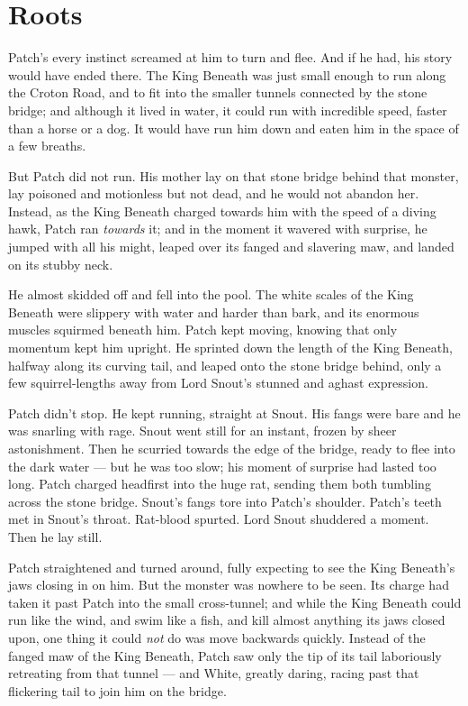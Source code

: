 \documentclass[ebook,oneside,openany,17pt]{memoir}
\newenvironment{tolerant}[1]{%
  \par\tolerance=#1\relax
}{%
  \par
}
\renewcommand{\thechapter}{\Roman{chapter}}
\newcounter{sections}
\newcommand{\sections}[1]{%
  \section*{#1}
  \addtocounter{sections}{1}%
  \pdfbookmark[1]{#1}{section.\thechapter.\thesections}}
\begin{document}

\sections{Roots}

Patch’s every instinct screamed at him to turn and flee. And if he
had, his story would have ended there. The King Beneath was just small
enough to run along the Croton Road, and to fit into the smaller
tunnels connected by the stone bridge; and although it lived in water,
it could run with incredible speed, faster than a horse or a dog. It
would have run him down and eaten him in the space of a few breaths.

But Patch did not run. His mother lay on that stone bridge behind that
monster, lay poisoned and motionless but not dead, and he would not
abandon her. Instead, as the King Beneath charged towards him with the
speed of a diving hawk, Patch ran \emph{towards} it; and in the
moment it wavered with surprise, he jumped with all his might, leaped
over its fanged and slavering maw, and landed on its stubby neck.

\begin{tolerant}{1000}
He almost skidded off and fell into the pool. The white scales of the
King Beneath were slippery with water and harder than bark, and its
enormous muscles squirmed beneath him. Patch kept moving, knowing that
only momentum kept him upright. He sprint\-ed down the length of the
King Beneath, halfway along its curving tail, and leaped onto the
stone bridge behind, only a few squirrel-lengths away from Lord
Snout’s stunned and aghast expression.
\end{tolerant}

\begin{tolerant}{1000}
Patch didn’t stop. He kept running, straight at Snout. His fangs were
bare and he was snarling with rage. Snout went still for an instant,
frozen by sheer astonishment. Then he scurried towards the edge of the
bridge, ready to flee into the dark water — but he was too slow; his
moment of surprise had lasted too long. Patch charged headfirst into
the huge rat, sending them both tumbling across the stone
bridge. Snout’s fangs tore into Patch’s shoulder. Patch’s teeth met in
Snout’s throat. Rat-blood spurted. Lord Snout shuddered a moment. Then
he lay still.
\end{tolerant}

Patch straightened and turned around, fully expecting to see the King
Beneath’s jaws closing in on him. But the monster was nowhere to be
seen. Its charge had taken it past Patch into the small cross-tunnel;
and while the King Beneath could run like the wind, and swim like a
fish, and kill almost anything its jaws closed upon, one thing it
could \emph{not} do was move backwards quickly. Instead of the
fanged maw of the King Beneath, Patch saw only the tip of its tail
laboriously retreating from that tunnel — and White, greatly daring,
racing past that flickering tail to join him on the bridge.
\end{document}
